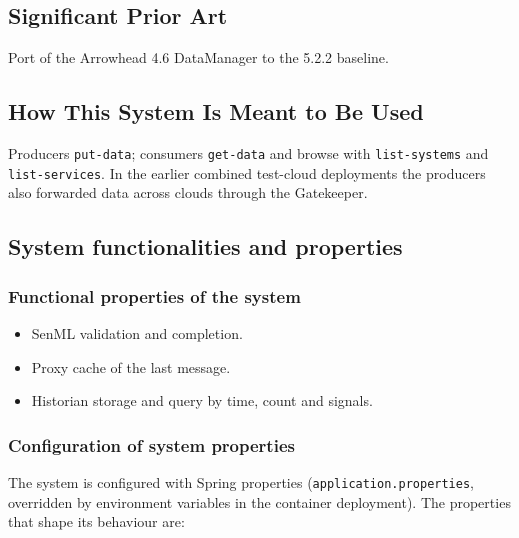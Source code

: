 \documentclass[a4paper]{arrowhead}
\begin{document}
\newpage

\subsection{Significant Prior Art}
\label{sec:prior_art}

Port of the Arrowhead 4.6 DataManager to the 5.2.2 baseline.

\subsection{How This System Is Meant to Be Used}
\label{sec:use}

Producers \texttt{put-\allowbreak{}data}; consumers \texttt{get-\allowbreak{}data} and browse with \texttt{list-\allowbreak{}systems} and \texttt{list-\allowbreak{}services}. In the earlier combined test-cloud deployments the producers also forwarded data across clouds through the Gatekeeper.

\subsection{System functionalities and properties}
\label{sec:properties}

\subsubsection{Functional properties of the system}

\begin{itemize}
  \item SenML validation and completion.
  \item Proxy cache of the last message.
  \item Historian storage and query by time, count and signals.
\end{itemize}

\subsubsection{Configuration of system properties}

The system is configured with Spring properties (\texttt{application.properties}, overridden by environment variables in the container deployment). The properties that shape its behaviour are:
\end{document}
